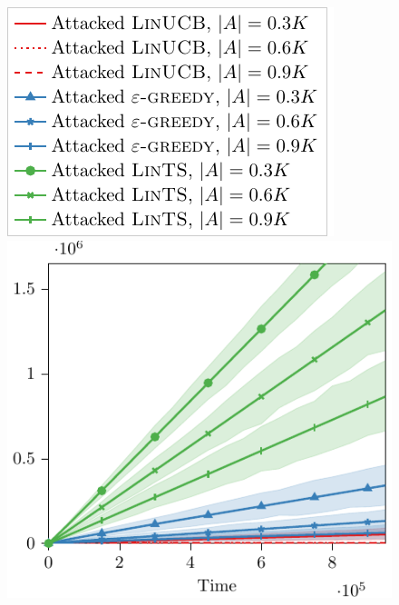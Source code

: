 \begin{figure}
\begin{minipage}{0.25\linewidth}
        \centering
        \includegraphics[width=0.85\linewidth]{sections/appendix/nips2020-bandits/images/regret_cost_attacks_context/simulations/legend.pdf}
    \end{minipage}\hfill
    \begin{minipage}{0.25\linewidth}
    \centering
    \includegraphics[width=0.95\linewidth]{sections/appendix/nips2020-bandits/images/regret_cost_attacks_context/simulations/cost_context_attack_simulations.pdf}
    \end{minipage}\hfill
    \begin{minipage}{0.25\linewidth}
    \centering

\end{minipage}
\end{figure}
